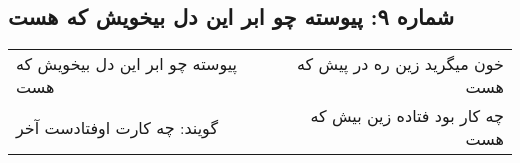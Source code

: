 \begin{center}
\section*{شماره ۹: پیوسته چو ابر این دل بیخویش که هست}
\label{sec:009}
\begin{longtable}{l p{0.5cm} r}
پیوسته چو ابر این دل بیخویش که هست
&&
خون میگرید زین ره در پیش که هست
\\
گویند: چه کارت اوفتادست آخر
&&
چه کار بود فتاده زین بیش که هست
\\
\end{longtable}
\end{center}
